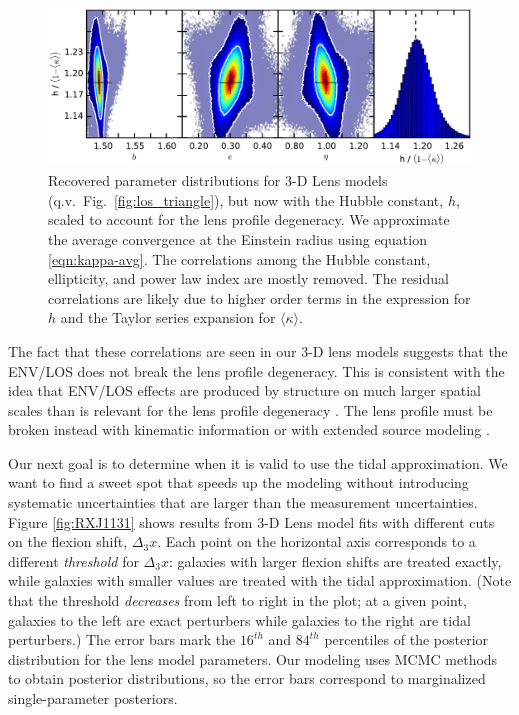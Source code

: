 \documentclass{emulateapj}
\begin{document}
\begin{figure}[ht]
\begin{center}
\includegraphics[width=1\textwidth]{los_scaled_h.pdf}
\caption{\label{fig:scaled_triangle} Recovered parameter distributions for 3-D Lens models (q.v.\ Fig.\ \ref{fig:los_triangle}), but now with the Hubble constant, $h$, scaled to account for the lens profile degeneracy.  We approximate the average convergence at the Einstein radius using equation \ref{eqn:kappa-avg}. The correlations among the Hubble constant, ellipticity, and power law index are mostly removed. The residual correlations are likely due to higher order terms in the expression for $h$ \citep{Kochanek02} and the Taylor series expansion for $\langle \kappa \rangle$.%
}
\end{center}
\end{figure}

The fact that these correlations are seen in our 3-D lens models suggests that the ENV/LOS does not break the lens profile degeneracy. This is consistent with the idea that ENV/LOS effects are produced by structure on much larger spatial scales than is relevant for the lens profile degeneracy \citep{Xu16,Schneider13}. The lens profile must be broken instead with kinematic information \citep[e.g.,][]{Suyu13} or with extended source modeling \citep{Suyu12}.

Our next goal is to determine when it is valid to use the tidal approximation.  We want to find a sweet spot that speeds up the modeling without introducing systematic uncertainties that are larger than the measurement uncertainties.  Figure \ref{fig:RXJ1131} shows results from 3-D Lens model fits with different cuts on the flexion shift, $\Delta_3 x$.  Each point on the horizontal axis corresponds to a different \emph{threshold} for $\Delta_3 x$: galaxies with larger flexion shifts are treated exactly, while galaxies with smaller values are treated with the tidal approximation.  (Note that the threshold \emph{decreases} from left to right in the plot; at a given point, galaxies to the left are exact perturbers while galaxies to the right are tidal perturbers.)  The error bars mark the $16^{th}$ and $84^{th}$ percentiles of the posterior distribution for the lens model parameters.  Our modeling uses MCMC methods to obtain posterior distributions, so the error bars correspond to marginalized single-parameter posteriors.
\end{document}
